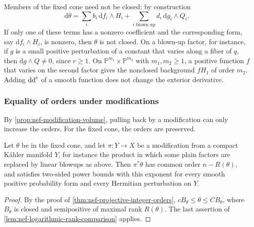 Members of the fixed cone need not be closed: by construction
\[
 \mathrm d\theta=\sum_i b_i\,\mathrm df_i\wedge H_i
                  +\sum_{i\text{ blown up}}d_i\,\mathrm dg_i\wedge Q_i.
\]
If only one of these terms has a nonzero coefficient and the corresponding form, say $\mathrm df_i\wedge H_i$, is nonzero, then $\theta$ is not closed. On a blown-up factor, for instance, if $g$ is a small positive perturbation of a constant that varies along a fiber of $q$, then $\mathrm dg\wedge Q\ne0$, since $r\geq1$. On $\mathbb P^{m_1}\times\mathbb P^{m_2}$ with $m_1,m_2\geq1$, a positive function $f$ that varies on the second factor gives the nonclosed background $fH_1$ of order $m_2$. Adding $\mathrm{dd}^{\mathrm{c}}$ of a smooth function does not change the exterior derivative.

\subsubsection{Equality of orders under modifications}
By \cref{prop:nef-modification-volume}, pulling back by a modification can only increase the orders. For the fixed cone, the orders are preserved.

\begin{proposition}\label{prop:nef-projective-modification-equality}
Let $\theta$ be in the fixed cone, and let $\pi\colon Y\to X$ be a modification from a compact K\"ahler manifold $Y$, for instance the product in which some plain factors are replaced by linear blowups as above. Then $\pi^*\theta$ has common order $n-R(\theta)$, and satisfies two-sided power bounds with this exponent for every smooth positive probability form and every Hermitian perturbation on $Y$.
\end{proposition}
\begin{proof}
By the proof of \cref{thm:nef-projective-integer-orders}, $cB_\theta\leq\theta\leq CB_\theta$, where $B_\theta$ is closed and semipositive of maximal rank $R(\theta)$. The last assertion of \cref{lem:nef-logarithmic-rank-comparison} applies.
\end{proof}


